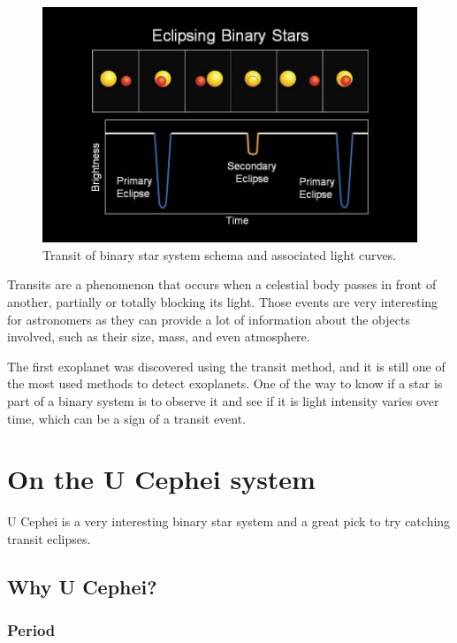 \documentclass[12pt,a4paper]{article}
\begin{document}
\begin{figure}[H]
    \centering
    \includegraphics[width=1\textwidth]{assets/star-transits.jpg}
    \caption{Transit of binary star system schema and associated light curves. \cite{VariableStar}}
    \label{fig:transits}
\end{figure}


Transits are a phenomenon that occurs when a celestial body passes in front of another, partially or totally blocking its light.
Those events are very interesting for astronomers as they can provide a lot of information about the objects involved, such as their size, mass, and even atmosphere.

The first exoplanet was discovered using the transit method, and it is still one of the most used methods to detect exoplanets.
One of the way to know if a star is part of a binary system is to observe it and see if it is light intensity varies over time, which can be a sign of a transit event.

\section{On the U Cephei system}

U Cephei is a very interesting binary star system and a great pick to try catching transit eclipses. 

\subsection{Why U Cephei?}

\subsubsection{Period}
\end{document}
